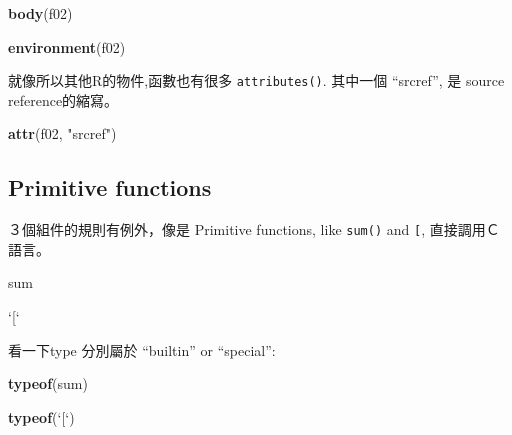 \documentclass[]{book}
\newenvironment{Shaded}{\begin{snugshade}}{\end{snugshade}}
\newcommand{\DataTypeTok}[1]{\textcolor[rgb]{0.13,0.29,0.53}{#1}}
\newcommand{\KeywordTok}[1]{\textcolor[rgb]{0.13,0.29,0.53}{\textbf{#1}}}
\newcommand{\NormalTok}[1]{#1}
\newcommand{\StringTok}[1]{\textcolor[rgb]{0.31,0.60,0.02}{#1}}
\theoremstyle{definition}
\theoremstyle{definition}
\theoremstyle{definition}
\theoremstyle{remark}
\begin{document}
\begin{Shaded}
\begin{Highlighting}[]
\KeywordTok{body}\NormalTok{(f02)}
\end{Highlighting}
\end{Shaded}

\begin{Shaded}
\begin{Highlighting}[]
\KeywordTok{environment}\NormalTok{(f02)}
\end{Highlighting}
\end{Shaded}

就像所以其他R的物件,函數也有很多 \texttt{attributes()}. 其中一個
``srcref'', 是 source reference的縮寫。 　

\begin{Shaded}
\begin{Highlighting}[]
\KeywordTok{attr}\NormalTok{(f02, }\StringTok{"srcref"}\NormalTok{)}
\end{Highlighting}
\end{Shaded}

\hypertarget{primitive-functions}{%
\subsection{Primitive functions}\label{primitive-functions}}

３個組件的規則有例外，像是 Primitive functions, like \texttt{sum()} and
\texttt{{[}}, 直接調用Ｃ語言。

\begin{Shaded}
\begin{Highlighting}[]
\NormalTok{sum}
\end{Highlighting}
\end{Shaded}

\begin{Shaded}
\begin{Highlighting}[]
\StringTok{`}\DataTypeTok{[}\StringTok{`}
\end{Highlighting}
\end{Shaded}

看一下type 分別屬於 ``builtin'' or ``special'':

\begin{Shaded}
\begin{Highlighting}[]
\KeywordTok{typeof}\NormalTok{(sum)}
\end{Highlighting}
\end{Shaded}

\begin{Shaded}
\begin{Highlighting}[]
\KeywordTok{typeof}\NormalTok{(}\StringTok{`}\DataTypeTok{[}\StringTok{`}\NormalTok{)}
\end{Highlighting}
\end{Shaded}
\end{document}
